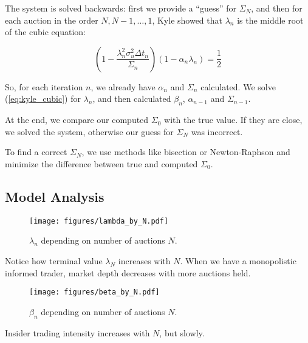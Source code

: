 \documentclass{beamer}
\begin{document}
\begin{frame}
The system is solved backwards: first we provide a ``guess'' for $\Sigma_N$, and then for each auction in the order $N, N - 1, \ldots, 1$, Kyle showed that $\lambda_n$ is the middle root of the cubic equation:

\begin{equation}\label{eq:kyle_cubic}
    \left(1 - \dfrac{\lambda_n^2\sigma_u^2\Delta t_n}{\Sigma_n}\right)(1 - \alpha_n\lambda_n) = \dfrac{1}{2}
\end{equation}

So, for each iteration $n$, we already have $\alpha_n$ and $\Sigma_n$ calculated. We solve (\ref{eq:kyle_cubic}) for $\lambda_n$, and then calculated $\beta_n$, $\alpha_{n-1}$ and $\Sigma_{n-1}$. 

At the end, we compare our computed $\Sigma_0$ with the true value. If they are close, we solved the system, otherwise our guess for $\Sigma_N$ was incorrect. 

To find a correct $\Sigma_N$, we use methods like bisection or Newton-Raphson and minimize the difference between true and computed $\Sigma_0$.

\end{frame}

\subsection{Model Analysis}

\begin{frame}
    \begin{figure}\label{fig:lambda_on_N}
        \texttt{[image: figures/lambda\_by\_N.pdf]}
        \caption{$\lambda_n$ depending on number of auctions $N$.}
    \end{figure}

    Notice how terminal value $\lambda_N$ increases with $N$. When we have a monopolistic informed trader, market depth decreases with more auctions held.
\end{frame}

\begin{frame}
    \begin{figure}\label{fig:beta_on_N}
        \texttt{[image: figures/beta\_by\_N.pdf]}
        \caption{$\beta_n$ depending on number of auctions $N$.}
    \end{figure}

    Insider trading intensity increases with $N$, but slowly.

\end{frame}
\end{document}

